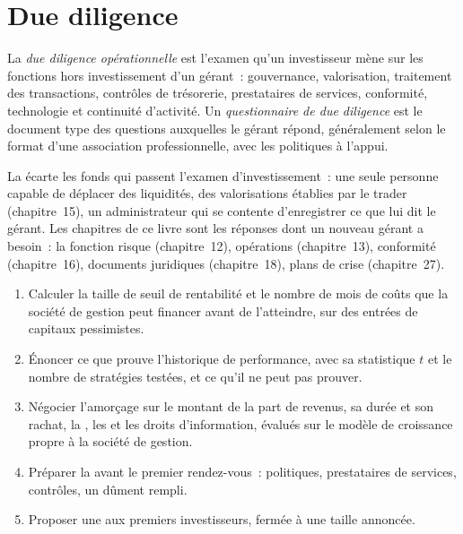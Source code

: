 \section{Due diligence}

\begin{definition}\label{def:fm:launching-a-fund-and-raising-capital:odd}
La \emph{due diligence opérationnelle} est l'examen qu'un investisseur mène sur les fonctions hors investissement d'un gérant~: gouvernance,
valorisation, traitement des transactions, contrôles de trésorerie, prestataires de services, conformité, technologie et continuité d'activité. Un \emph{questionnaire de
due diligence} est le document type des questions auxquelles le gérant répond, généralement selon le format
d'une association professionnelle, avec les politiques à l'appui.
\end{definition}

La  écarte les fonds qui passent l'examen d'investissement~: une seule personne capable de déplacer des liquidités, des valorisations établies par le trader (chapitre~15), un
administrateur qui se contente d'enregistrer ce que lui dit le gérant. Les chapitres de ce livre sont les réponses dont un nouveau gérant a besoin~: la fonction risque
(chapitre~12), opérations (chapitre~13), conformité (chapitre~16), documents juridiques (chapitre~18), plans de crise (chapitre~27).

\begin{method}\label{met:fm:launching-a-fund-and-raising-capital:raise}
\begin{enumerate}
\item Calculer la taille de seuil de rentabilité et le nombre de mois de coûts que la société de gestion peut financer avant de l'atteindre, sur des entrées de capitaux pessimistes.
\item Énoncer ce que prouve l'historique de performance, avec sa statistique $t$ et le nombre de stratégies testées, et ce qu'il ne peut pas prouver.
\item Négocier l'amorçage sur le montant de la part de revenus, sa durée et son rachat, la , les  et les droits d'information, évalués sur le
modèle de croissance propre à la société de gestion.
\item Préparer la  avant le premier rendez-vous~: politiques, prestataires de services, contrôles, un  dûment rempli.
\item Proposer une  aux premiers investisseurs, fermée à une taille annoncée.
\end{enumerate}
\end{method}

